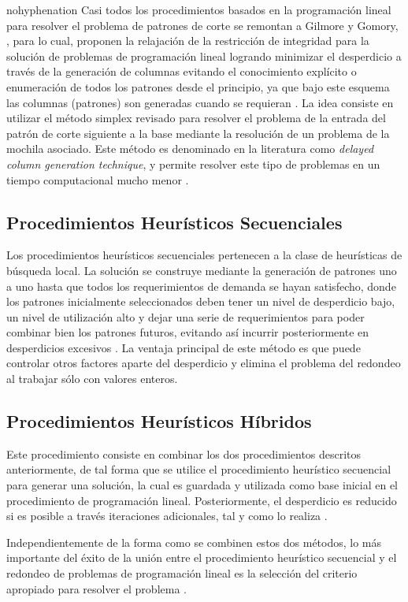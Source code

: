 \documentclass[a4paper,10pt,twocolumn]{article}
\begin{document}
\begin{hyphenrules}{nohyphenation}
Casi todos los procedimientos basados en la
programación lineal para resolver el problema de
patrones de corte se remontan a Gilmore y Gomory,
\cite{1}, para lo cual, proponen la relajación de la restricción
de integridad para la solución de problemas de
programación lineal logrando minimizar el desperdicio
a través de la generación de columnas evitando el
conocimiento explícito o enumeración de todos los
patrones desde el principio, ya que bajo este esquema
las columnas (patrones) son generadas cuando se
requieran \cite{2}. La idea consiste en utilizar el método
simplex revisado para resolver el problema de la entrada
del patrón de corte siguiente a la base mediante la
resolución de un problema de la mochila asociado. Este
método es denominado en la literatura como \textit{delayed
column generation technique}, y permite resolver este
tipo de problemas en un tiempo computacional mucho
menor \cite{3}.


\subsection{Procedimientos Heurísticos Secuenciales}
Los procedimientos heurísticos secuenciales pertenecen
a la clase de heurísticas de búsqueda local. La solución
se construye mediante la generación de patrones uno
a uno hasta que todos los requerimientos de demanda
se hayan satisfecho, donde los patrones inicialmente
seleccionados deben tener un nivel de desperdicio
bajo, un nivel de utilización alto y dejar una serie de requerimientos para poder combinar bien los patrones
futuros, evitando así incurrir posteriormente en
desperdicios excesivos \cite{3}. La ventaja principal de este método es que puede controlar otros factores aparte del desperdicio y elimina
el problema del redondeo al trabajar sólo con valores
enteros.

\subsection{Procedimientos Heurísticos Híbridos }
Este procedimiento consiste en combinar los dos
procedimientos descritos anteriormente, de tal forma
que se utilice el procedimiento heurístico secuencial
para generar una solución, la cual es guardada y
utilizada como base inicial en el procedimiento de
programación lineal. Posteriormente, el desperdicio es
reducido si es posible a través iteraciones adicionales,
tal y como lo realiza \cite{41}. 

Independientemente de la forma como
se combinen estos dos métodos, lo más importante
del éxito de la unión entre el procedimiento heurístico
secuencial y el redondeo de problemas de programación
lineal es la selección del criterio apropiado para resolver
el problema \cite{29}.


\end{hyphenrules}
\end{document}
